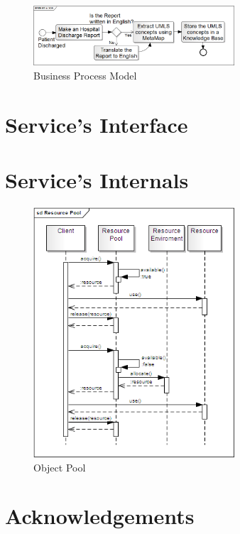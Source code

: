 \documentclass[11pt]{article}
\begin{document}
\begin{figure}[!ht]
\begin{center}
\includegraphics[width=7.5cm]{mtsoa}
\end{center}
\caption{Business Process Model}
\label{fig:mtsoa}
\end{figure}

\section{Service's Interface}


\section{Service's Internals}

\begin{figure}[!ht]
\begin{center}
\includegraphics[width=7.5cm]{resource_pool}
\end{center}
\caption{Object Pool}
\label{fig:rp}
\end{figure}

\section{Acknowledgements}





\end{document}
